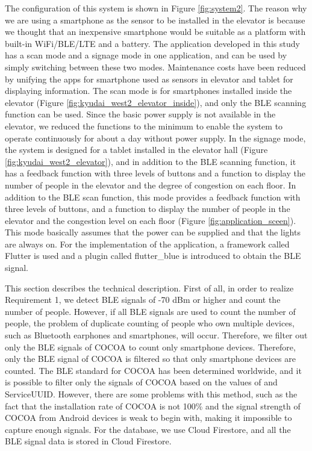 The configuration of this system is shown in Figure \ref{fig:system2}. The reason why we are using a smartphone as the sensor to be installed in the elevator is because we thought that an inexpensive smartphone would be suitable as a platform with built-in WiFi/BLE/LTE and a battery. The application developed in this study has a scan mode and a signage mode in one application, and can be used by simply switching between these two modes. Maintenance costs have been reduced by unifying the apps for smartphone used as sensors in elevator and tablet for displaying information. The scan mode is for smartphones installed inside the elevator (Figure \ref{fig:kyudai_west2_elevator_inside}), and only the BLE scanning function can be used. Since the basic power supply is not available in the elevator, we reduced the functions to the minimum to enable the system to operate continuously for about a day without power supply. In the signage mode, the system is designed for a tablet installed in the elevator hall (Figure \ref{fig:kyudai_west2_elevator}), and in addition to the BLE scanning function, it has a feedback function with three levels of buttons and a function to display the number of people in the elevator and the degree of congestion on each floor. In addition to the BLE scan function, this mode provides a feedback function with three levels of buttons, and a function to display the number of people in the elevator and the congestion level on each floor (Figure \ref{fig:application_sceen}). This mode basically assumes that the power can be supplied and that the lights are always on. For the implementation of the application, a framework called Flutter is used and a plugin called flutter\_blue is introduced to obtain the BLE signal.

This section describes the technical description. First of all, in order to realize Requirement 1, we detect BLE signals of -70 dBm or higher and count the number of people. However, if all BLE signals are used to count the number of people, the problem of duplicate counting of people who own multiple devices, such as Bluetooth earphones and smartphones, will occur. Therefore, we filter out only the BLE signals of COCOA to count only smartphone devices. Therefore, only the BLE signal of COCOA is filtered so that only smartphone devices are counted. The BLE standard for COCOA has been determined worldwide, and it is possible to filter only the signals of COCOA based on the values of \cite{cocoa_ble} and ServiceUUID. However, there are some problems with this method, such as the fact that the installation rate of COCOA is not 100\% and the signal strength of COCOA from Android devices is weak to begin with, making it impossible to capture enough signals. For the database, we use Cloud Firestore, and all the BLE signal data is stored in Cloud Firestore. 

